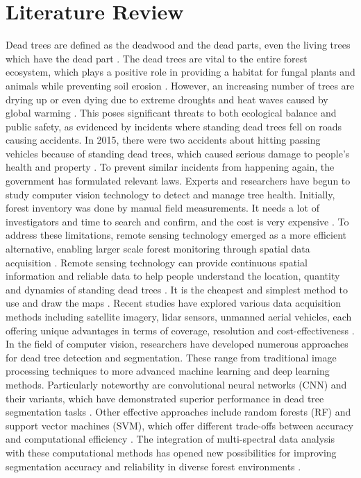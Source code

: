\section{Literature Review}
Dead trees are defined as the deadwood and the dead parts, even the living trees which have the dead part \cite{b2}. The dead trees are vital to the entire forest ecosystem, which plays a positive role in providing a habitat for fungal plants and animals while preventing soil erosion \cite{b2}. However, an increasing number of trees are drying up or even dying due to extreme droughts and heat waves caused by global warming \cite{b3}. This poses significant threats to both ecological balance and public safety, as evidenced by incidents where standing dead trees fell on roads causing accidents. In 2015, there were two accidents about hitting passing vehicles because of standing dead trees, which caused serious damage to people’s health and property \cite{b29}. To prevent similar incidents from happening again, the government has formulated relevant laws. Experts and researchers have begun to study computer vision technology to detect and manage tree health. Initially, forest inventory was done by manual field measurements. It needs a lot of investigators and time to search and confirm, and the cost is very expensive \cite{b4}. To address these limitations, remote sensing technology emerged as a more efficient alternative, enabling larger scale forest monitoring through spatial data acquisition \cite{b1}. Remote sensing technology can provide continuous spatial information and reliable data to help people understand the location, quantity and dynamics of standing dead trees \cite{b5}. It is the cheapest and simplest method to use and draw the maps \cite{b2}. Recent studies have explored various data acquisition methods including satellite imagery, lidar sensors, unmanned aerial vehicles, each offering unique advantages in terms of coverage, resolution and cost-effectiveness \cite{b6}. In the field of computer vision, researchers have developed numerous approaches for dead tree detection and segmentation. These range from traditional image processing techniques to more advanced machine learning and deep learning methods. Particularly noteworthy are convolutional neural networks (CNN) and their variants, which have demonstrated superior performance in dead tree segmentation tasks \cite{b6}. Other effective approaches include random forests (RF) and support vector machines (SVM), which offer different trade-offs between accuracy and computational efficiency \cite{b7}. The integration of multi-spectral data analysis with these computational methods has opened new possibilities for improving segmentation accuracy and reliability in diverse forest environments \cite{b6}. 